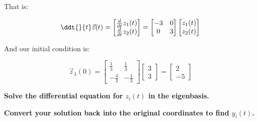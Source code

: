 \begin{enumerate}
{That is:

	$$\ddt{}{t} \vec{z}(t) = \begin{bmatrix}\frac{d}{dt} z_{1}(t) \\ \frac{d}{dt}z_{2}(t)\end{bmatrix} = \begin{bmatrix}-3 & 0 \\ 0 & 3\end{bmatrix}\begin{bmatrix}z_{1}(t) \\ z_{2}(t)\end{bmatrix}$$

And our initial condition is:

$$\vec z_{\lambda}(0) = \begin{bmatrix}\frac{1}{3} & \frac{1}{3} \\ -\frac{4}{3} & -\frac{1}{3}\end{bmatrix}\begin{bmatrix} 3 \\ 3 \end{bmatrix} = \begin{bmatrix} 2 \\ -5 \end{bmatrix} $$
}

\qitem \textbf{Solve the differential equation for $z_{i}(t)$ in the eigenbasis.}

\ws{
	\vspace{5em}
}


\ws{
	\vspace{5em}
}

\qitem \textbf{Convert your solution back into the original coordinates to find $y_i(t)$.}




\end{enumerate}
